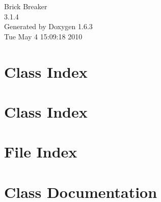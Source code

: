 \documentclass[a4paper]{book}
\begin{document}
\hypersetup{pageanchor=false}
\begin{titlepage}
\vspace*{7cm}
\begin{center}
{\Large Brick Breaker \\[1ex]\large 3.1.4 }\\
\vspace*{1cm}
{\large Generated by Doxygen 1.6.3}\\
\vspace*{0.5cm}
{\small Tue May 4 15:09:18 2010}\\
\end{center}
\end{titlepage}
\clearemptydoublepage
{}
\tableofcontents
\clearemptydoublepage
{}
\hypersetup{pageanchor=true}
\chapter{Class Index}

\chapter{Class Index}

\chapter{File Index}

\chapter{Class Documentation}



































\end{document}
